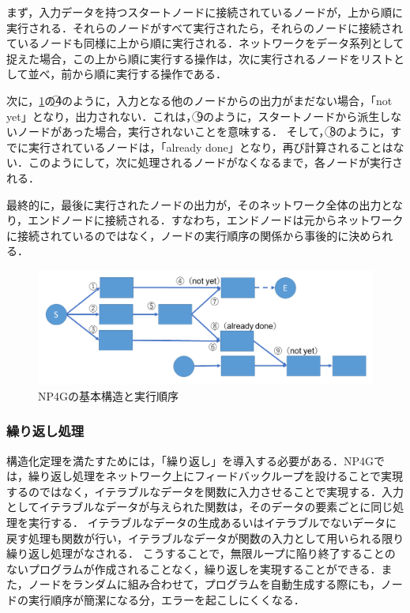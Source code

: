 \documentclass[exploratorypaper]{jsaiart} %
\begin{document}
まず，入力データを持つスタートノードに接続されているノードが，上から順に実行される．それらのノードがすべて実行されたら，それらのノードに接続されているノードも同様に上から順に実行される．ネットワークをデータ系列として捉えた場合，この上から順に実行する操作は，次に実行されるノードをリストとして並べ，前から順に実行する操作である．

次に，\ref{fig:sequence}の\textcircled{\scriptsize 4}のように，入力となる他のノードからの出力がまだない場合，「not yet」となり，出力されない．これは，\textcircled{\scriptsize 9}のように，スタートノードから派生しないノードがあった場合，実行されないことを意味する．
そして，\textcircled{\scriptsize 8}のように，すでに実行されているノードは，「already done」となり，再び計算されることはない．このようにして，次に処理されるノードがなくなるまで，各ノードが実行される．

最終的に，最後に実行されたノードの出力が，そのネットワーク全体の出力となり，エンドノードに接続される．すなわち，エンドノードは元からネットワークに接続されているのではなく，ノードの実行順序の関係から事後的に決められる．

\begin{figure}[t]
    \begin{center}
        \includegraphics[width=130mm]{sequence.png}
    \end{center}
    \capwidth=90mm %
    \caption{NP4Gの基本構造と実行順序}
    \label{fig:sequence}
\end{figure}

\subsubsection{繰り返し処理}
構造化定理を満たすためには，「繰り返し」を導入する必要がある．NP4Gでは，繰り返し処理をネットワーク上にフィードバックループを設けることで実現するのではなく，イテラブルなデータを関数に入力させることで実現する．入力としてイテラブルなデータが与えられた関数は，そのデータの要素ごとに同じ処理を実行する．
イテラブルなデータの生成あるいはイテラブルでないデータに戻す処理も関数が行い，イテラブルなデータが関数の入力として用いられる限り繰り返し処理がなされる．
こうすることで，無限ループに陥り終了することのないプログラムが作成されることなく，繰り返しを実現することができる．また，ノードをランダムに組み合わせて，プログラムを自動生成する際にも，ノードの実行順序が簡潔になる分，エラーを起こしにくくなる．
\end{document}

